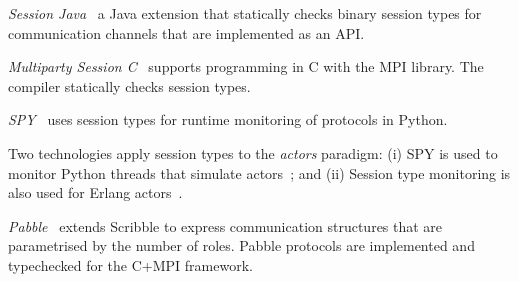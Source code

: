 %
%
%
%
%
%
%
%


%
{\em Session Java}~\cite{HU07TYPE-SAFE}
a Java extension that statically checks binary session types for communication channels
that are implemented as an API.

{\em Multiparty Session C}~\cite{NYH12} supports programming in C with the MPI library. The compiler statically checks session types.

{\em SPY}~\cite{DBLP:conf/rv/NeykovaYH13} uses session types for runtime monitoring of %
protocols in Python.

Two technologies apply session types to the {\em actors} paradigm:
(i) SPY is used to monitor Python threads that simulate actors~\cite{DBLP:conf/coordination/NeykovaY14}; and
(ii)	Session type monitoring is also used for Erlang actors~\cite{SF15}.

{\em Pabble}~\cite{pabble:NY15} extends Scribble to express communication
structures that are parametrised by the number of roles.
Pabble protocols are implemented and typechecked for the C+MPI framework.

